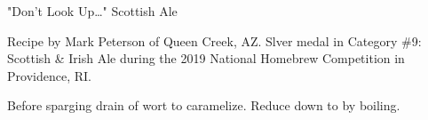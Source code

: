 \stylesection{\stylescottishheavy}

\begin{recipe}{"Don't Look Up\ldots" Scottish Ale}

\begin{aboutblock}
Recipe by Mark Peterson of Queen Creek, AZ. Slver medal in Category \#9:
Scottish \& Irish Ale during the 2019 National Homebrew Competition
in Providence, RI. \sourceaha
\end{aboutblock}


\begin{methodandtiming}
 
\begin{mashsteps}
\end{mashsteps}

\begin{fermentationsteps}
\end{fermentationsteps}

\begin{directions}
Before sparging drain  of wort to caramelize. Reduce down to 
by boiling.
\end{directions}

\end{methodandtiming}

\recipebreak

\begin{ingredientsblock}

\begin{malts}
\end{malts}

\begin{hops}
\end{hops}


\end{ingredientsblock}

\end{recipe}
